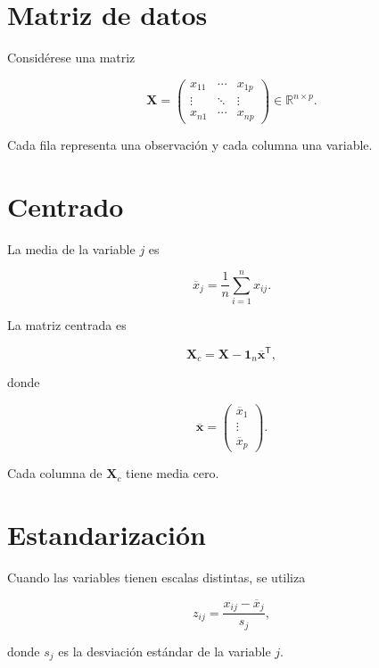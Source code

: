 \documentclass[
  spanish,
  10.5pt,
  letterpaper,
  DIV=11,
  numbers=noendperiod,
  oneside,
  open=any]{scrreprt}
\theoremstyle{definition}
\theoremstyle{definition}
\theoremstyle{plain}
\theoremstyle{remark}
\begin{document}
\section*{Matriz de datos}\label{matriz-de-datos}


Considérese una matriz

\[
\mathbf{X}
=
\begin{pmatrix}
x_{11} & \cdots & x_{1p}\\
\vdots & \ddots & \vdots\\
x_{n1} & \cdots & x_{np}
\end{pmatrix}
\in\mathbb{R}^{n\times p}.
\]

Cada fila representa una observación y cada columna una variable.

\section*{Centrado}\label{centrado}


La media de la variable \(j\) es

\[
\overline{x}_j
=
\frac{1}{n}
\sum_{i=1}^{n}x_{ij}.
\]

La matriz centrada es

\[
\mathbf{X}_c
=
\mathbf{X}
-
\mathbf{1}_n
\overline{\mathbf{x}}^{\mathsf T},
\]

donde

\[
\overline{\mathbf{x}}
=
\begin{pmatrix}
\overline{x}_1\\
\vdots\\
\overline{x}_p
\end{pmatrix}.
\]

Cada columna de \(\mathbf{X}_c\) tiene media cero.

\section*{Estandarización}\label{estandarizaciuxf3n-2}


Cuando las variables tienen escalas distintas, se utiliza

\[
z_{ij}
=
\frac{x_{ij}-\overline{x}_j}{s_j},
\]

donde \(s_j\) es la desviación estándar de la variable \(j\).
\end{document}
